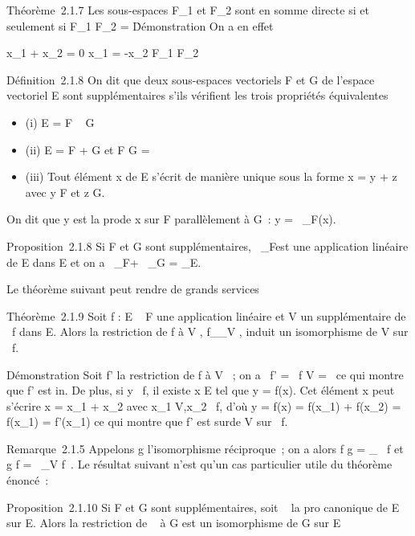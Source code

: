 \documentclass[]{article}
\begin{document}
Théorème~2.1.7 Les sous-espaces F\_1 et F\_2 sont en
somme directe si et seulement si F\_1 \bigcap F\_2 =
\0\.

Démonstration On a en effet

x\_1 + x\_2 = 0 \Leftrightarrow
x\_1 = -x\_2 \in F\_1 \bigcap F\_2

Définition~2.1.8 On dit que deux sous-espaces vectoriels F et G de
l'espace vectoriel E sont supplémentaires s'ils vérifient les trois
propriétés équivalentes

\begin{itemize}
\itemsep1pt\parskip0pt
\item
  (i) E = F \oplus~ G
\item
  (ii) E = F + G et F \bigcap G = \0\
\item
  (iii) Tout élément x de E s'écrit de manière unique sous la forme x =
  y + z avec y \in F et z \in G.
\end{itemize}

On dit que y est la pro\jmathection de x sur F parallèlement à G~: y =
\pi~\_F\parallelG(x).

Proposition~2.1.8 Si F et G sont supplémentaires, \pi~\_F\parallelG est une
application linéaire de E dans E et on a \pi~\_F\parallelG + \pi~\_G\parallelF
= \mathrmId\_E.

Le théorème suivant peut rendre de grands services

Théorème~2.1.9 Soit f : E \rightarrow~ F une application linéaire et V un
supplémentaire de
\mathrmKer~f dans E. Alors
la restriction de f à V , f\_\textbar{}\_V , induit un
isomorphisme de V sur
\mathrmIm~f.

Démonstration Soit f' la restriction de f à V ~; on a
\mathrmKer~f'
= \mathrmKer~f \bigcap V =
\0\ ce qui montre que f' est
in\jmathective. De plus, si y
\in\mathrmIm~f, il existe x \in
E tel que y = f(x). Cet élément x peut s'écrire x = x\_1 +
x\_2 avec x\_1 \in V,x\_2
\in\mathrmKer~f, d'où y = f(x)
= f(x\_1) + f(x\_2) = f(x\_1) = f'(x\_1)
ce qui montre que f' est sur\jmathective de V sur
\mathrmIm~f.

Remarque~2.1.5 Appelons g l'isomorphisme réciproque~; on a alors f \cdot g
=
\mathrmId\_\mathrmIm~
f et g \cdot f = \pi~\_V
\parallel\mathrmKer f~. Le
résultat suivant n'est qu'un cas particulier utile du théorème énoncé~:

Proposition~2.1.10 Si F et G sont supplémentaires, soit \pi~ la pro\jmathection
canonique de E sur E\diagupF. Alors la restriction de \pi~ à G est un
isomorphisme de G sur E\diagupF
\end{document}
